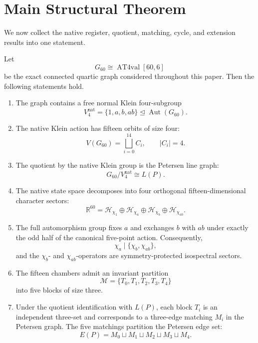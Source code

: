 \section{Main Structural Theorem}

We now collect the native register, quotient, matching, cycle, and
extension results into one statement.

\begin{theorem}
Let
\[
G_{60}\cong \operatorname{AT4val}[60,6]
\]
be the exact connected quartic graph considered throughout this paper.
Then the following statements hold.

\begin{enumerate}
    \item The graph contains a free normal Klein four-subgroup
    \[
    V_4^{\mathrm{nat}}
    =
    \{1,a,b,ab\}
    \trianglelefteq
    \operatorname{Aut}(G_{60}).
    \]

    \item The native Klein action has fifteen orbits of size four:
    \[
    V(G_{60})
    =
    \bigsqcup_{i=0}^{14} C_i,
    \qquad
    |C_i|=4.
    \]

    \item The quotient by the native Klein group is the Petersen line
    graph:
    \[
    G_{60}/V_4^{\mathrm{nat}}
    \cong
    L(P).
    \]

    \item The native state space decomposes into four orthogonal
    fifteen-dimensional character sectors:
    \[
    \mathbb R^{60}
    =
    \mathcal H_{\chi_1}
    \oplus
    \mathcal H_{\chi_a}
    \oplus
    \mathcal H_{\chi_b}
    \oplus
    \mathcal H_{\chi_{ab}}.
    \]

    \item The full automorphism group fixes \(a\) and exchanges \(b\)
    with \(ab\) under exactly the odd half of the canonical
    five-point action. Consequently,
    \[
    \chi_a
    \mid
    \{\chi_b,\chi_{ab}\},
    \]
    and the \(\chi_b\)- and \(\chi_{ab}\)-operators are
    symmetry-protected isospectral sectors.

    \item The fifteen chambers admit an invariant partition
    \[
    \mathcal M
    =
    \{T_0,T_1,T_2,T_3,T_4\}
    \]
    into five blocks of size three.

    \item Under the quotient identification with \(L(P)\), each
    block \(T_i\) is an independent three-set and corresponds to a
    three-edge matching \(M_i\) in the Petersen graph. The five
    matchings partition the Petersen edge set:
    \[
    E(P)
    =
    M_0\sqcup M_1\sqcup M_2\sqcup M_3\sqcup M_4.
    \]


\end{enumerate}
\end{theorem}

